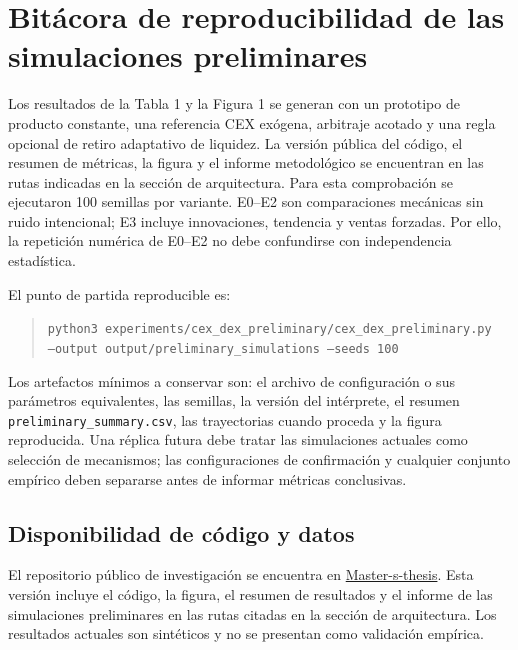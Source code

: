 \section{Bitácora de reproducibilidad de las simulaciones preliminares}

Los resultados de la Tabla 1 y la Figura 1 se generan con un prototipo de producto
constante, una referencia CEX exógena, arbitraje acotado y una regla opcional de retiro
adaptativo de liquidez. La versión pública del código, el resumen de métricas, la figura
y el informe metodológico se encuentran en las rutas indicadas en la sección de
arquitectura. Para esta comprobación se ejecutaron 100 semillas por variante. E0--E2
son comparaciones mecánicas sin ruido intencional; E3 incluye innovaciones, tendencia y
ventas forzadas. Por ello, la repetición numérica de E0--E2 no debe confundirse con
independencia estadística.

El punto de partida reproducible es:

\begin{quote}
\texttt{python3 experiments/cex\_dex\_preliminary/cex\_dex\_preliminary.py}\\
\texttt{--output output/preliminary\_simulations --seeds 100}
\end{quote}

Los artefactos mínimos a conservar son: el archivo de configuración o sus parámetros
equivalentes, las semillas, la versión del intérprete, el resumen
\texttt{preliminary\_summary.csv}, las trayectorias cuando proceda y la figura
reproducida. Una réplica futura debe tratar las simulaciones actuales como selección de
mecanismos; las configuraciones de confirmación y cualquier conjunto empírico deben
separarse antes de informar métricas conclusivas.

\subsection*{Disponibilidad de código y datos}

El repositorio público de investigación se encuentra en
\href{https://github.com/edwardcalderon/Master-s-thesis}{Master-s-thesis}. Esta versión incluye el código,
la figura, el resumen de resultados y el informe de las simulaciones preliminares en las
rutas citadas en la sección de arquitectura. Los resultados actuales son sintéticos y
no se presentan como validación empírica.
